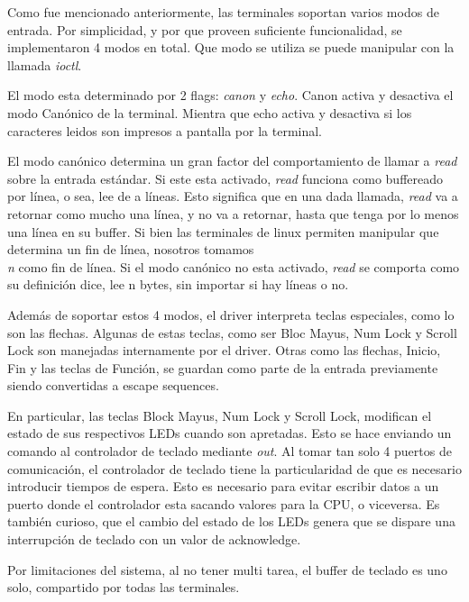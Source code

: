 \documentclass[a4paper,10pt]{article}
\begin{document}
            Como fue mencionado anteriormente, las terminales soportan varios modos de entrada.
            Por simplicidad, y por que proveen suficiente funcionalidad, se implementaron 4 modos en total.
            Que modo se utiliza se puede manipular con la llamada \textit{ioctl}.

            El modo esta determinado por 2 flags: \textit{canon} y \textit{echo}.
            Canon activa y desactiva el modo Canónico de la terminal.
            Mientra que echo activa y desactiva si los caracteres leidos son impresos a pantalla por la terminal.

            El modo canónico determina un gran factor del comportamiento de llamar a \textit{read} sobre la entrada estándar.
            Si este esta activado, \textit{read} funciona como buffereado por línea, o sea, lee de a líneas.
            Esto significa que en una dada llamada, \textit{read} va a retornar como mucho una línea, y no va a retornar, hasta que tenga por lo menos una línea en su buffer.
            Si bien las terminales de linux permiten manipular que determina un fin de línea, nosotros tomamos \textit{\\n} como fin de línea.
            Si el modo canónico no esta activado, \textit{read} se comporta como su definición dice, lee n bytes, sin importar si hay líneas o no.

            Además de soportar estos 4 modos, el driver interpreta teclas especiales, como lo son las flechas.
            Algunas de estas teclas, como ser Bloc Mayus, Num Lock y Scroll Lock son manejadas internamente por el driver.
            Otras como las flechas, Inicio, Fin y las teclas de Función, se guardan como parte de la entrada previamente siendo convertidas a escape sequences.

            En particular, las teclas Block Mayus, Num Lock y Scroll Lock, modifican el estado de sus respectivos LEDs cuando son apretadas.
            Esto se hace enviando un comando al controlador de teclado mediante \textit{out}. 
            Al tomar tan solo 4 puertos de comunicación, el controlador de teclado tiene la particularidad de que es necesario introducir tiempos de espera.
            Esto es necesario para evitar escribir datos a un puerto donde el controlador esta sacando valores para la CPU, o viceversa.
            Es también curioso, que el cambio del estado de los LEDs genera que se dispare una interrupción de teclado con un valor de acknowledge.

            Por limitaciones del sistema, al no tener multi tarea, el buffer de teclado es uno solo, compartido por todas las terminales.
\end{document}
